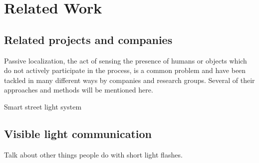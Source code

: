 \chapter{Related Work}
\label{Related Work}

\section{Related projects and companies}
Passive localization, the act of sensing the presence of humans or objects which do not actively participate in the process, is a common problem and have been tackled in many different ways by companies and research groups. Several of their approaches and methods will be mentioned here.



Smart street light system \cite{tvilight}

\cite{Tile_Track}
\cite{WIFI_Tracking}
\cite{PIR_Tracking}

\section{Visible light communication}
\label{sec:Visible light communication}
Talk about other things people do with short light flashes.\\


\cite{Dark_Light_Rises}
\cite{Dark_VLC}
\cite{indoor_VLC_no_LOS}
\cite{Human_Sensing_Using_VLC}
